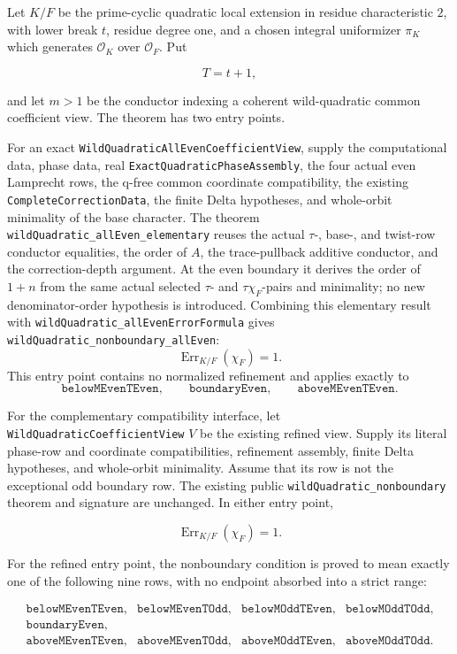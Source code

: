 \begin{theorem}\label{mod:cases-wildquadratic-nonboundary}
Let \(K/F\) be the prime-cyclic quadratic local extension in residue
characteristic \(2\), with lower break \(t\), residue degree one, and a
chosen integral uniformizer \(\pi_K\) which generates
\(\mathcal O_K\) over \(\mathcal O_F\).  Put

\[
  T=t+1,
\]

and let \(m>1\) be the conductor indexing a coherent
wild-quadratic common coefficient view.  The theorem has two entry points.

For an exact \texttt{WildQuadraticAllEvenCoefficientView}, supply the
computational data, phase data, real
\texttt{ExactQuadraticPhaseAssembly}, the four actual even Lamprecht rows,
the q-free common coordinate compatibility, the existing
\texttt{CompleteCorrectionData}, the finite Delta hypotheses, and
whole-orbit minimality of the base character.  The theorem
\texttt{wildQuadratic\_allEven\_elementary} reuses the actual
\(\tau\)-, base-, and twist-row conductor equalities, the order of \(A\),
the trace-pullback additive conductor, and the correction-depth argument.
At the even boundary it derives the order of \(1+n\) from the same actual
selected \(\tau\)- and \(\tau\chi_F\)-pairs and minimality; no new
denominator-order hypothesis is introduced.  Combining this elementary
result with \texttt{wildQuadratic\_allEvenErrorFormula} gives
\texttt{wildQuadratic\_nonboundary\_allEven}:
\[
 \operatorname{Err}_{K/F}(\chi_F)=1.
\]
This entry point contains no normalized refinement and applies exactly to
\[
 \texttt{belowMEvenTEven},\qquad
 \texttt{boundaryEven},\qquad
 \texttt{aboveMEvenTEven}.
\]

For the complementary compatibility interface, let
\texttt{WildQuadraticCoefficientView} \(V\) be the existing refined view.
Supply its literal phase-row and coordinate compatibilities, refinement
assembly, finite Delta hypotheses, and whole-orbit minimality.  Assume that
its row is not the exceptional odd boundary row.  The existing public
\texttt{wildQuadratic\_nonboundary} theorem and signature are unchanged.
In either entry point,

\[
 \operatorname{Err}_{K/F}(\chi_F)=1.
\]

For the refined entry point, the nonboundary condition is proved to mean
exactly one of the following nine rows, with no endpoint absorbed into a
strict range:

\[
\begin{array}{llll}
 \texttt{belowMEvenTEven},&\texttt{belowMEvenTOdd},&
 \texttt{belowMOddTEven},&\texttt{belowMOddTOdd},\\
 \texttt{boundaryEven},\\
 \texttt{aboveMEvenTEven},&\texttt{aboveMEvenTOdd},&
 \texttt{aboveMOddTEven},&\texttt{aboveMOddTOdd}.
\end{array}
\]


\end{theorem}

